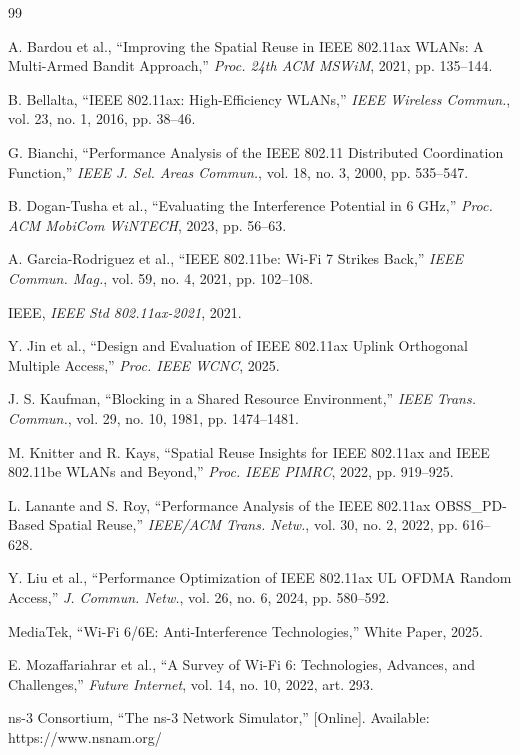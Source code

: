 \documentclass[conference]{IEEEtran}
\begin{document}

\begin{thebibliography}{99}

 A. Bardou et al., ``Improving the Spatial Reuse in IEEE 802.11ax WLANs: A Multi-Armed Bandit Approach,'' \textit{Proc. 24th ACM MSWiM}, 2021, pp. 135–144.

 B. Bellalta, ``IEEE 802.11ax: High-Efficiency WLANs,'' \textit{IEEE Wireless Commun.}, vol. 23, no. 1, 2016, pp. 38–46.

 G. Bianchi, ``Performance Analysis of the IEEE 802.11 Distributed Coordination Function,'' \textit{IEEE J. Sel. Areas Commun.}, vol. 18, no. 3, 2000, pp. 535–547.

 B. Dogan-Tusha et al., ``Evaluating the Interference Potential in 6 GHz,'' \textit{Proc. ACM MobiCom WiNTECH}, 2023, pp. 56–63.

 A. Garcia-Rodriguez et al., ``IEEE 802.11be: Wi-Fi 7 Strikes Back,'' \textit{IEEE Commun. Mag.}, vol. 59, no. 4, 2021, pp. 102–108.

 IEEE, \textit{IEEE Std 802.11ax-2021}, 2021.

 Y. Jin et al., ``Design and Evaluation of IEEE 802.11ax Uplink Orthogonal Multiple Access,'' \textit{Proc. IEEE WCNC}, 2025.

 J. S. Kaufman, ``Blocking in a Shared Resource Environment,'' \textit{IEEE Trans. Commun.}, vol. 29, no. 10, 1981, pp. 1474–1481.

 M. Knitter and R. Kays, ``Spatial Reuse Insights for IEEE 802.11ax and IEEE 802.11be WLANs and Beyond,'' \textit{Proc. IEEE PIMRC}, 2022, pp. 919–925.

 L. Lanante and S. Roy, ``Performance Analysis of the IEEE 802.11ax OBSS\_PD-Based Spatial Reuse,'' \textit{IEEE/ACM Trans. Netw.}, vol. 30, no. 2, 2022, pp. 616–628.

 Y. Liu et al., ``Performance Optimization of IEEE 802.11ax UL OFDMA Random Access,'' \textit{J. Commun. Netw.}, vol. 26, no. 6, 2024, pp. 580–592.

 MediaTek, ``Wi-Fi 6/6E: Anti-Interference Technologies,'' White Paper, 2025.

 E. Mozaffariahrar et al., ``A Survey of Wi-Fi 6: Technologies, Advances, and Challenges,'' \textit{Future Internet}, vol. 14, no. 10, 2022, art. 293.

 ns-3 Consortium, ``The ns-3 Network Simulator,'' [Online]. Available: https://www.nsnam.org/


\end{thebibliography}
\end{document}
